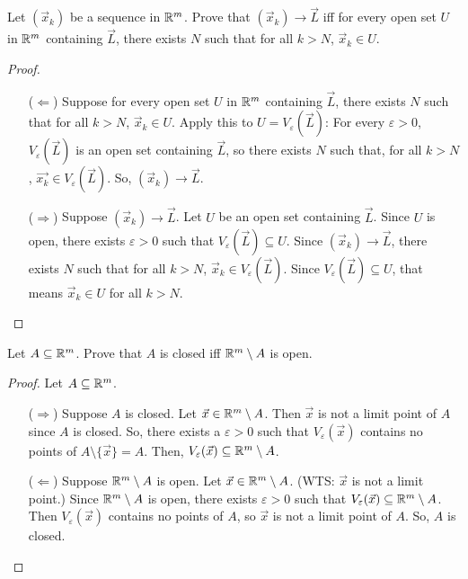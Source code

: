 \begin{example}
Let $(\vec{x}_k)$ be a sequence in $\mathbb{R}^m$. Prove that $(\vec{x}_k)\to \vec{L}$ iff for every open set $U$ in $\mathbb{R}^m$ containing $\vec{L}$, there exists $N$ such that for all $k>N$, $\vec{x}_k\in U$.
\begin{proof}\
\begin{itemize}
    \item[($\Leftarrow$)] Suppose for every open set $U$ in $\mathbb{R}^m$ containing $\vec{L}$, there exists $N$ such that for all $k>N$, $\vec{x}_k\in U$. Apply this to $U=V_\varepsilon(\vec{L})$: For every $\varepsilon>0$, $V_\varepsilon(\vec{L})$ is an open set containing $\vec{L}$, so there exists $N$ such that, for all $k>N$, $\vec{x_k}\in V_\varepsilon(\vec{L})$. So, $(\vec{x}_k)\to \vec{L}$.
    \item[($\Rightarrow$)] Suppose $(\vec{x}_k) \to \vec{L}$. Let $U$ be an open set containing $\vec{L}$. Since $U$ is open, there exists $\varepsilon>0$ such that $V_\varepsilon(\vec{L}) \subseteq U$. Since $(\vec{x}_k)\to \vec{L}$, there exists $N$ such that for all $k>N$, $\vec{x}_k\in V_\varepsilon(\vec{L})$. Since $V_\varepsilon(\vec{L})\subseteq U$, that means $\vec{x}_k\in U$ for all $k>N$.
\end{itemize}
\end{proof}
\end{example}

\begin{example}
Let $A\subseteq \mathbb{R}^m$. Prove that $A$ is closed iff $\mathbb{R}^m\setminus A$ is open.
\begin{proof}
Let $A \subseteq \mathbb{R}^m$.
\begin{itemize}
    \item[($\Rightarrow$)] Suppose $A$ is closed. Let $\vec{x}\in \mathbb{R}^m\setminus A$. Then $\vec{x}$ is not a limit point of $A$ since $A$ is closed. So, there exists a $\varepsilon>0$ such that $V_\varepsilon(\vec{x})$ contains no points of $A\setminus\{\vec{x}\}=A$. Then, $V_\varepsilon(\vec{x})\subseteq \mathbb{R}^m\setminus A$.
    \item[($\Leftarrow$)] Suppose $\mathbb{R}^m\setminus A$ is open. Let $\vec{x}\in \mathbb{R}^m\setminus A$. (WTS: $\vec{x}$ is not a limit point.) Since $\mathbb{R}^m\setminus A$ is open, there exists $\varepsilon>0$ such that $V_\varepsilon(\vec{x}) \subseteq \mathbb{R}^m\setminus A$. Then $V_\varepsilon(\vec{x})$ contains no points of $A$, so $\vec{x}$ is not a limit point of $A$. So, $A$ is closed.
\end{itemize}
\end{proof}
\end{example}